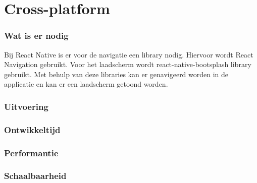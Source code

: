 


\section{Cross-platform}
\subsubsection{Wat is er nodig}
Bij React Native is er voor de navigatie een library nodig. Hiervoor wordt
React Navigation gebruikt. Voor het laadscherm wordt react-native-bootsplash library gebruikt. 
Met behulp van deze libraries kan er genavigeerd worden in de applicatie en kan er een laadscherm
getoond worden.

\subsubsection{Uitvoering}



\subsubsection{Ontwikkeltijd}



\subsubsection{Performantie}



\subsubsection{Schaalbaarheid}




